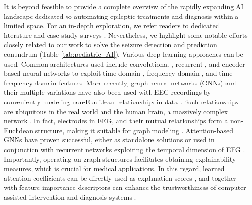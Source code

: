 \documentclass[a4paper,fleqn]{cas-sc}
\begin{document}
It is beyond feasible to provide a complete overview of the rapidly expanding AI landscape dedicated to automating epileptic treatments and diagnosis within a limited space. For an in-depth exploration, we refer readers to dedicated literature and case-study surveys \cite{kiral2018epileptic, Rasheed2021}. Nevertheless, we highlight some notable efforts closely related to our work to solve the seizure detection and prediction conundrum (Table \ref{tab:pediatric_AI}). Various deep-learning approaches can be used. Common architectures used include convolutional \cite{ke2018towards,zhou2018epileptic,hossain2019applying,GaoWaveletCnnClassification,hu2019mean,Wang1DCNNPrediction}, recurrent \cite{abdelhameed2018semi,abdelhameed2021deep,YaoBiLSTM}, and encoder-based \cite{yuan2017multi,abdelhameed2018semi,abdelhameed2021deep} neural networks to exploit time domain \cite{hossain2019applying,Wang1DCNNPrediction,YaoBiLSTM}, frequency domain \cite{hu2019mean,LiChenFFTCNN}, and time-frequency domain \cite{GaoWaveletCnnClassification,AssaliTemporalSpectralCNN} features. More recently, graph neural networks (GNNs) and their multiple variations have also been used with EEG recordings by conveniently modeling non-Euclidean relationships in data \cite{JiaEfficientGraphConv,ZhaoGraphFocalLoss,tao2022gnnisomorphism,jibon2023gcndnn}. Such relationships are ubiquitous in the real world and the human brain, a massively complex network \cite{BronsteinGeometricDL}. In fact, electrodes in EEG, and their mutual relationships form a non-Euclidean structure, making it suitable for graph modeling \cite{bruna2018plv}. Attention-based GNNs have proven successful, either as standalone solutions \cite{zhao2021seizuregat} or used in conjunction with recurrent networks exploiting the temporal dimension of EEG \cite{he2022gatblstm}. Importantly, operating on graph structures facilitates obtaining explainability measures, which is crucial for medical applications. In this regard, learned attention coefficients can be directly used as explanation scores \cite{raeisi2023explainable}, and together with feature importance descriptors can enhance the trustworthiness of computer-assisted intervention and diagnosis systems \cite{tveit2023automated,barnett2024improving}.
\end{document}
